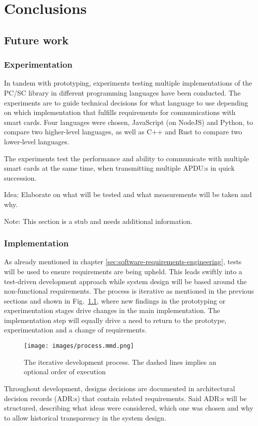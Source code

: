 \chapter{Conclusions}

\section{Future work}

\subsection{Experimentation}
\label{sec:experimentation}

In tandem with prototyping, experiments testing multiple
implementations of the PC/SC \cite{pcsc} library in different
programming languages have been conducted. The experiments are to
guide technical decisions for what language to use depending on
which implementation that fulfills requirements for communications
with smart cards. Four languages were chosen, JavaScript (on
NodeJS) and Python, to compare two higher-level languages, as well
as C++ and Rust to compare two lower-level languages.

The experiments test the performance and ability to communicate
with multiple smart cards at the same time, when transmitting
multiple APDU:s in quick succession.

Idea: Elaborate on what will be tested and what measurements will
be taken and why.

Note: This section is a stub and needs additional information.

\subsection{Implementation}
\label{sec:implementation}

As already mentioned in chapter
\ref{sec:software-requirements-engineering}, tests will be used to
ensure requirements are being upheld. This leads swiftly into a
test-driven development approach
\cite[242-245]{sommerville-software-engineering} while system
design will be based around the non-functional requirements. The
process is iterative as mentioned in the previous sections and
shown in Fig.~\ref{fig:process-diagram}, where new findings in the
prototyping or experimentation stages drive changes in the main
implementation. The implementation step will equally drive a need
to return to the prototype, experimentation and a change of
requirements.

\begin{figure}[ht]
	\centering
	\texttt{[image: images/process.mmd.png]}
	\caption{The iterative development process. The dashed lines
	implies an optional order of execution}
	\label{fig:process-diagram}
\end{figure}

Throughout development, designs decisions are documented in
architectural decision records (ADR:s) \cite{adr, adr-github} that
contain related requirements. Said ADR:s will be structured,
describing what ideas were considered, which one was chosen and why
to allow historical transparency in the system design.
